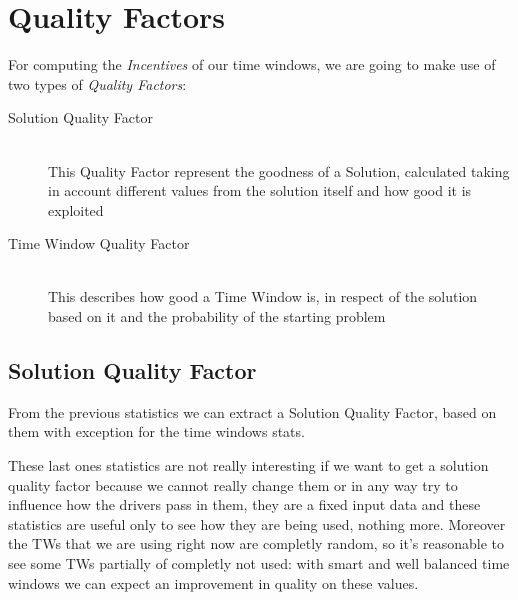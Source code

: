 \documentclass[10pt, letterpaper]{article}
\begin{document}
\section{Quality Factors}
For computing the \emph{Incentives} of our time windows, we are going to make
use of two types of \emph{Quality Factors}:
\begin{description}
	\item[Solution Quality Factor] \hfill \\
		This Quality Factor represent the goodness of a Solution, calculated
		taking in account different values from the solution itself and how good
		it is exploited
	\item[Time Window Quality Factor] \hfill \\
		This describes how good a Time Window is, in respect of the solution
		based on it and the probability of the starting problem
\end{description}

\subsection{Solution Quality Factor}
From the previous statistics we can extract a Solution Quality Factor, based on
them with exception for the time windows stats.

These last ones statistics are not really interesting if we want to get a
solution quality factor because we cannot really change them or in any way try
to influence how the drivers pass in them, they are a fixed input data and these
statistics are useful only to see how they are being used, nothing more.
Moreover the TWs that we are using right now are completly random, so it's
reasonable to see some TWs partially of completly not used: with smart and well
balanced time windows we can expect an improvement in quality on these values.
\end{document}
